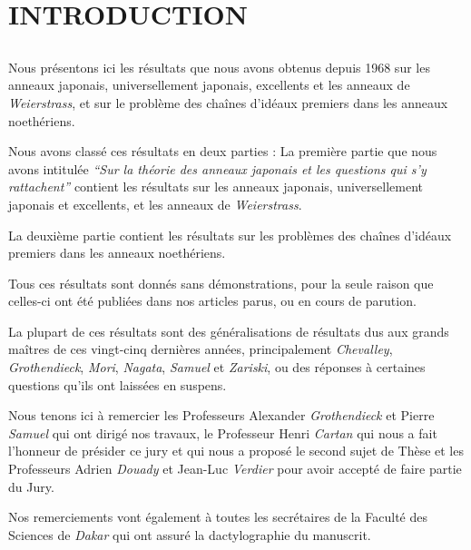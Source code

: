 

\setcounter{page}{1}
\chapter*{INTRODUCTION}\thispagestyle{empty}
\label{sec:intro}
\section*{}

Nous présentons ici les résultats que nous avons obtenus depuis 1968 sur les anneaux japonais, universellement japonais, excellents et les anneaux de \emph{Weierstrass}, et sur le problème des chaînes d'idéaux premiers dans les anneaux noethériens.

Nous avons classé ces résultats en deux parties : La première partie que nous avons intitulée \emph{``Sur la théorie des anneaux japonais et les questions qui s'y rattachent''} contient les résultats sur les anneaux japonais, universellement japonais et excellents, et les anneaux de \emph{Weierstrass}.

La deuxième partie contient les résultats sur les problèmes des chaînes d'idéaux premiers dans les anneaux noethériens.

Tous ces résultats sont donnés sans démonstrations, pour la seule raison que celles-ci ont été publiées dans nos articles parus, ou en cours de parution.

La plupart de ces résultats sont des généralisations de résultats dus aux grands maîtres de ces vingt-cinq dernières années, principalement \emph{Chevalley}, \emph{Grothendieck}, \emph{Mori}, \emph{Nagata}, \emph{Samuel} et \emph{Zariski}, ou des réponses à certaines questions qu'ils ont laissées en suspens.

Nous tenons ici à remercier les Professeurs Alexander \emph{Grothendieck} et Pierre \emph{Samuel} qui ont dirigé nos travaux, le Professeur Henri \emph{Cartan} qui nous a fait l'honneur de présider ce jury et qui nous a proposé le second sujet de Thèse et les Professeurs Adrien \emph{Douady} et Jean-Luc \emph{Verdier} pour avoir accepté de faire partie du Jury.  

Nos remerciements vont également à toutes les secrétaires de la Faculté des Sciences de \emph{Dakar} qui ont assuré la dactylographie du manuscrit.

